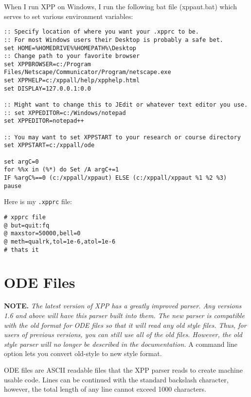 \documentclass{article}
\begin{document}
When I run XPP on {Windows}, I run the following bat file (xppaut.bat) which serves
to set various environment variables:
{\color{red}
\begin{verbatim}
:: Specify location of where you want your .xpprc to be.
:: For most Windows users their Desktop is probably a safe bet.
set HOME=%HOMEDRIVE%%HOMEPATH%\Desktop
:: Change path to your favorite browser
set XPPBROWSER=c:/Program Files/Netscape/Communicator/Program/netscape.exe
set XPPHELP=c:/xppall/help/xpphelp.html
set DISPLAY=127.0.0.1:0.0

:: Might want to change this to JEdit or whatever text editor you use.
:: set XPPEDITOR=c:/Windows/notepad
set XPPEDITOR=notepad++

:: You may want to set XPPSTART to your research or course directory
set XPPSTART=c:/xppall/ode

set argC=0
for %%x in (%*) do Set /A argC+=1
IF %argC%==0 (c:/xppall/xppaut) ELSE (c:/xppall/xppaut %1 %2 %3)
pause
\end{verbatim}}

Here is my {\tt .xpprc} file:
{\color{red}\begin{verbatim}
# xpprc file
@ but=quit:fq
@ maxstor=50000,bell=0
@ meth=qualrk,tol=1e-6,atol=1e-6
# thats it
\end{verbatim}}

\section{ODE Files}

{\bf NOTE.}  {\em The latest version of XPP has a greatly improved
parser. Any versions 1.6 and above will have this parser built into
them.  The new parser is compatible with the old format for ODE files
so that it will read any old style files.  Thus, for users of previous
versions, you can still use all of the old files.
However, the old style parser will no longer be described in the
documentation.}  A command line option lets you convert old-style to
new style format.


ODE files are ASCII readable files that the XPP parser reads to create
 machine usable code. Lines can be continued with the standard
backslash character, however, the total length of any line cannot
exceed 1000 characters.
\end{document}
